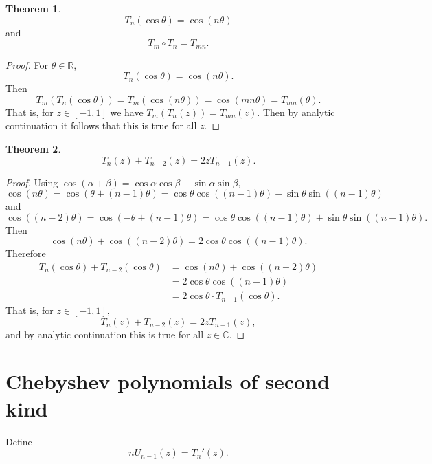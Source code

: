 \documentclass{article}
\theoremstyle{definition}
\newtheorem{theorem}{Theorem}
\theoremstyle{definition}
\begin{document}
\begin{theorem}
\[
T_n(\cos \theta) = \cos(n\theta)
\]
and
\[
T_m \circ T_n = T_{mn}.
\]
\label{Tncos}
\end{theorem}
\begin{proof}
For $\theta \in \mathbb{R}$,
\[
T_n(\cos \theta) = \cos(n\theta).
\]
Then
\[
T_m(T_n(\cos \theta)) = T_m( \cos (n\theta))
=\cos (mn\theta)
=T_{mn}(\theta).
\]
That is, for $z \in [-1,1]$ we have
$T_m(T_n(z)) = T_{mn}(z)$. Then by analytic continuation it follows that
this is true for all $z$.
\end{proof}

\begin{theorem}
\[
T_n(z)+T_{n-2}(z)=2zT_{n-1}(z).
\]
\end{theorem}
\begin{proof}
Using $\cos(\alpha+\beta)=\cos \alpha \cos \beta - \sin \alpha \sin \beta$, 
\[
\cos(n\theta) = \cos(\theta+(n-1)\theta)
=\cos \theta \cos((n-1)\theta)-\sin\theta\sin((n-1)\theta)
\]
and
\[
\cos((n-2)\theta) = \cos(-\theta+(n-1)\theta)
=\cos \theta \cos((n-1)\theta)+\sin\theta\sin((n-1)\theta).
\]
Then
\[
\cos(n\theta)+\cos((n-2)\theta)=2 \cos \theta \cos((n-1)\theta).
\]
Therefore
\begin{align*}
T_n(\cos \theta)+T_{n-2}(\cos\theta)&=\cos(n\theta)
+\cos((n-2)\theta)\\
&=2 \cos \theta \cos((n-1)\theta)\\
&=2 \cos \theta \cdot T_{n-1}(\cos\theta).
\end{align*}
That is, for $z \in [-1,1]$,
\[
T_n(z)+T_{n-2}(z)=2zT_{n-1}(z),
\]
and by analytic continuation this is true for all $z \in \mathbb{C}$.
\end{proof}



\section{Chebyshev polynomials of second kind}
Define
\begin{equation}
nU_{n-1}(z) = T_n'(z).
\label{Un}
\end{equation}
\end{document}

